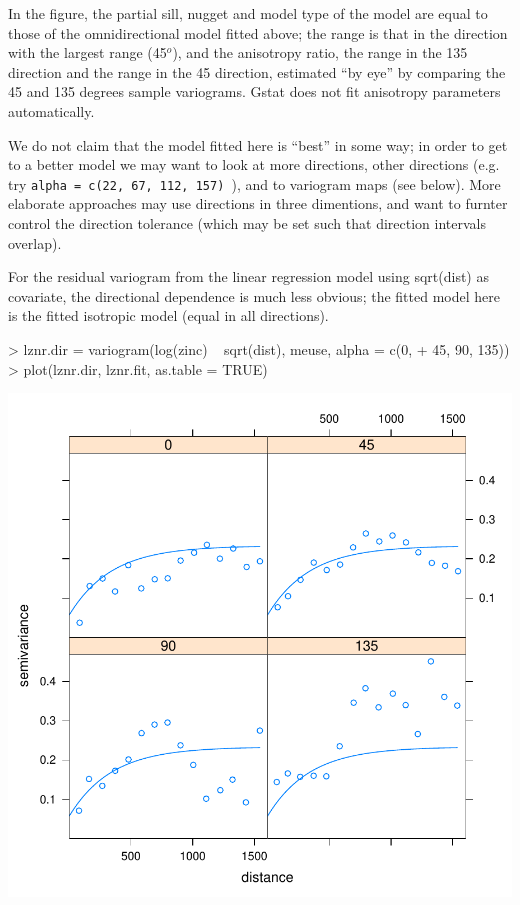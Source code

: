 \documentclass[a4paper]{article}
\begin{document}
In the figure, the partial sill, nugget and model type of the model are
equal to those of the omnidirectional model fitted above; the range
is that in the direction with the largest range (45$^o$), and the
anisotropy ratio, the range in the 135 direction and the range in the
45 direction, estimated ``by eye'' by comparing the 45 and 135 degrees
sample variograms. Gstat does not fit anisotropy parameters automatically.

We do not claim that the model fitted here is ``best'' in some way; in
order to get to a better model we may want to look at more directions,
other directions (e.g. try {\tt alpha = c(22, 67, 112, 157) }), and to
variogram maps (see below). More elaborate approaches may use directions
in three dimentions, and want to furnter control the direction tolerance
(which may be set such that direction intervals overlap).

For the residual variogram from the linear regression model using
sqrt(dist) as covariate, the directional dependence is much less
obvious; the fitted model here is the fitted isotropic model (equal in
all directions).

\begin{Schunk}
\begin{Sinput}
> lznr.dir = variogram(log(zinc) ~ sqrt(dist), meuse, alpha = c(0, 
+     45, 90, 135))
> plot(lznr.dir, lznr.fit, as.table = TRUE)
\end{Sinput}
\end{Schunk}

\includegraphics{gstat-019}
\end{document}
